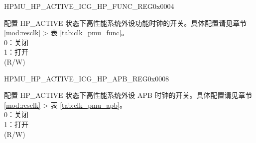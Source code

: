 \begin{register}{H}{PMU\_HP\_ACTIVE\_ICG\_HP\_FUNC\_REG}{0x0004}\label{regdesc:PMUHPACTIVEICGHPFUNCREG}
%
\regnewline%
\begin{regdesc}\begin{reglist}
\label{fielddesc:PMUHPACTIVEDIGICGFUNCEN}\item [PMU\_HP\_ACTIVE\_DIG\_ICG\_FUNC\_EN] 配置 HP\_ACTIVE 状态下高性能系统外设功能时钟的开关。具体配置请见章节 \ref{mod:resclk} \textit{} > 表 \ref{tab:clk_pmu_func}。 \\
0：关闭\\
1：打开\\
(R/W)
\end{reglist}\end{regdesc}
\end{register}


\begin{register}{H}{PMU\_HP\_ACTIVE\_ICG\_HP\_APB\_REG}{0x0008}\label{regdesc:PMUHPACTIVEICGHPAPBREG}
%
\regnewline%
\begin{regdesc}\begin{reglist}
\label{fielddesc:PMUHPACTIVEDIGICGAPBEN}\item [PMU\_HP\_ACTIVE\_DIG\_ICG\_APB\_EN] 配置 HP\_ACTIVE 状态下高性能系统外设 APB 时钟的开关。具体配置请见章节 \ref{mod:resclk} \textit{} > 表 \ref{tab:clk_pmu_apb}。\\
0：关闭\\
1：打开\\
(R/W)
\end{reglist}\end{regdesc}
\end{register}




